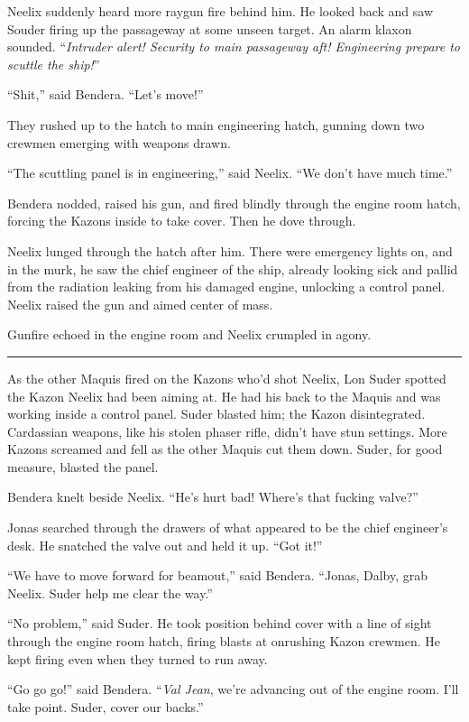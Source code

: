 \documentclass[twoside,letterpaper,12pt]{memoir}
\begin{document}
Neelix suddenly heard more raygun fire behind him. He looked back and saw Souder firing up the passageway at some unseen target. An alarm klaxon sounded. ``\textit{Intruder alert! Security to main passageway aft! Engineering prepare to scuttle the ship!}''

``Shit,'' said Bendera. ``Let's move!''

They rushed up to the hatch to main engineering hatch, gunning down two crewmen emerging with weapons drawn.

``The scuttling panel is in engineering,'' said Neelix. ``We don't have much time.''

Bendera nodded, raised his gun, and fired blindly through the engine room hatch, forcing the Kazons inside to take cover. Then he dove through.

Neelix lunged through the hatch after him. There were emergency lights on, and in the murk, he saw the chief engineer of the ship, already looking sick and pallid from the radiation leaking from his damaged engine, unlocking a control panel. Neelix raised the gun and aimed center of mass.

Gunfire echoed in the engine room and Neelix crumpled in agony.

\fancybreak{\rule{3cm}{0.4 pt}}
As the other Maquis fired on the Kazons who'd shot Neelix, Lon Suder spotted the Kazon Neelix had been aiming at. He had his back to the Maquis and was working inside a control panel. Suder blasted him; the Kazon disintegrated. Cardassian weapons, like his stolen phaser rifle, didn't have stun settings. More Kazons screamed and fell as the other Maquis cut them down. Suder, for good measure, blasted the panel.

Bendera knelt beside Neelix. ``He's hurt bad! Where's that fucking valve?''

Jonas searched through the drawers of what appeared to be the chief engineer's desk. He snatched the valve out and held it up. ``Got it!''

``We have to move forward for beamout,'' said Bendera. ``Jonas, Dalby, grab Neelix. Suder help me clear the way.''

``No problem,'' said Suder. He took position behind cover with a line of sight through the engine room hatch, firing blasts at onrushing Kazon crewmen. He kept firing even when they turned to run away.

``Go go go!'' said Bendera. ``\textit{Val Jean}, we're advancing out of the engine room. I'll take point. Suder, cover our backs.''
\end{document}
